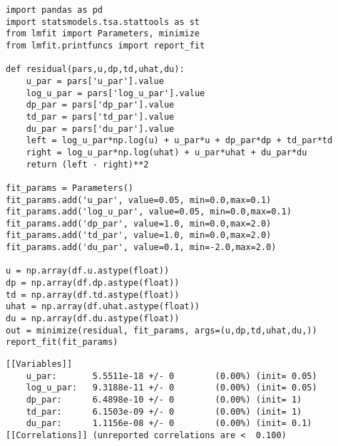 \documentclass[12pt,fleqn]{article}\usepackage{../../common}
\begin{document}
\begin{verbatim}
import pandas as pd
import statsmodels.tsa.stattools as st
from lmfit import Parameters, minimize
from lmfit.printfuncs import report_fit
    
def residual(pars,u,dp,td,uhat,du):
    u_par = pars['u_par'].value
    log_u_par = pars['log_u_par'].value
    dp_par = pars['dp_par'].value
    td_par = pars['td_par'].value
    du_par = pars['du_par'].value
    left = log_u_par*np.log(u) + u_par*u + dp_par*dp + td_par*td
    right = log_u_par*np.log(uhat) + u_par*uhat + du_par*du    
    return (left - right)**2

fit_params = Parameters()
fit_params.add('u_par', value=0.05, min=0.0,max=0.1)
fit_params.add('log_u_par', value=0.05, min=0.0,max=0.1)
fit_params.add('dp_par', value=1.0, min=0.0,max=2.0)
fit_params.add('td_par', value=1.0, min=0.0,max=2.0)
fit_params.add('du_par', value=0.1, min=-2.0,max=2.0)

u = np.array(df.u.astype(float))
dp = np.array(df.dp.astype(float))
td = np.array(df.td.astype(float))
uhat = np.array(df.uhat.astype(float))
du = np.array(df.du.astype(float))
out = minimize(residual, fit_params, args=(u,dp,td,uhat,du,))
report_fit(fit_params)
\end{verbatim}

\begin{verbatim}
[[Variables]]
    u_par:       5.5511e-18 +/- 0        (0.00%) (init= 0.05)
    log_u_par:   9.3188e-11 +/- 0        (0.00%) (init= 0.05)
    dp_par:      6.4898e-10 +/- 0        (0.00%) (init= 1)
    td_par:      6.1503e-09 +/- 0        (0.00%) (init= 1)
    du_par:      1.1156e-08 +/- 0        (0.00%) (init= 0.1)
[[Correlations]] (unreported correlations are <  0.100)
\end{verbatim}
\end{document}
